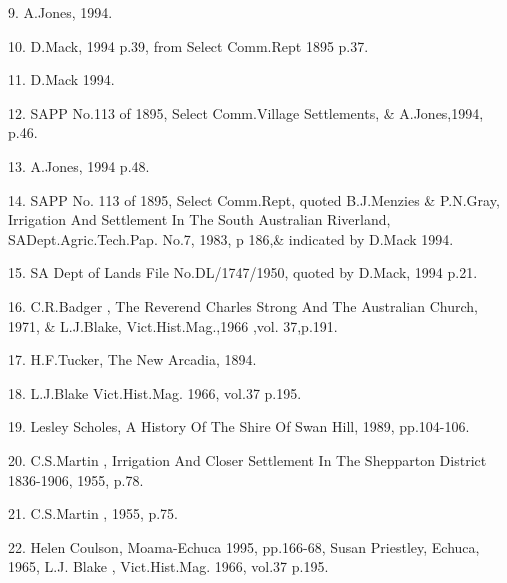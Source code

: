 9.  A.Jones, 1994.

10. D.Mack, 1994 p.39, from Select Comm.Rept 1895 p.37.

11. D.Mack 1994.

12. SAPP No.113 of 1895, Select Comm.Village Settlements, \&
     A.Jones,1994, p.46.

13. A.Jones, 1994 p.48.

14. SAPP No. 113 of 1895, Select Comm.Rept, quoted B.J.Menzies \&
      P.N.Gray, Irrigation And Settlement In The South Australian Riverland,
      SADept.Agric.Tech.Pap. No.7, 1983, p 186,\& indicated by D.Mack 
      1994.

15. SA Dept of Lands File No.DL/1747/1950, quoted by D.Mack, 1994 p.21.

16. C.R.Badger , The Reverend Charles Strong And The Australian Church,
      1971, \& L.J.Blake, Vict.Hist.Mag.,1966 ,vol. 37,p.191.

17. H.F.Tucker, The New Arcadia,  1894.

18. L.J.Blake Vict.Hist.Mag. 1966, vol.37 p.195.

19. Lesley Scholes, A History Of The Shire Of Swan Hill,  1989, pp.104-106.

20. C.S.Martin , Irrigation And Closer Settlement In The Shepparton District 
     1836-1906, 1955, p.78.

21. C.S.Martin , 1955, p.75. 

22.  Helen Coulson, Moama-Echuca 1995, pp.166-68, Susan Priestley, Echuca,
      1965,  L.J. Blake , Vict.Hist.Mag. 1966, vol.37 p.195.
